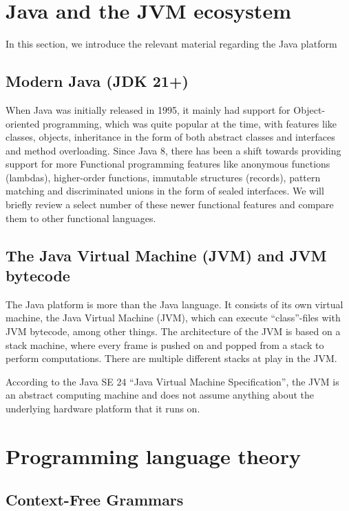\section{Java and the JVM ecosystem}

In this section, we introduce the relevant material regarding the Java platform

\subsection{Modern Java (JDK 21+)}

When Java was initially released in 1995, it mainly had support for Object-oriented 
programming, which was quite popular at the time, with features like classes, objects, 
inheritance in the form of both abstract classes and interfaces and method overloading.
Since Java 8, there has been a shift towards providing support for more Functional 
programming features like anonymous functions (lambdas), higher-order functions, immutable
structures (records), pattern matching and discriminated unions in the form of sealed 
interfaces. We will briefly review a select number of these newer functional features
and compare them to other functional languages.

\subsection{The Java Virtual Machine (JVM) and JVM bytecode}

The Java platform is more than the Java language. It consists of its own virtual machine,
the Java Virtual Machine (JVM), which can execute ``class''-files with JVM bytecode, among other things.
The architecture of the JVM is based on a stack machine, where every frame is pushed on and popped from
a stack to perform computations. There are multiple different stacks at play in the JVM.

According to the Java SE 24 ``Java Virtual Machine Specification'', the JVM is an abstract computing machine
and does not assume anything about the underlying hardware platform that it runs on.

\section{Programming language theory}

\subsection{Context-Free Grammars}

